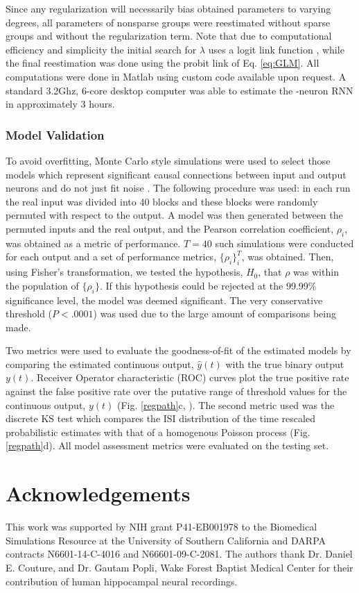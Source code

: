 \documentclass[11pt,a4paper,final]{article}
\begin{document}
Since any regularization will necessarily bias obtained parameters to varying degrees, all parameters of nonsparse groups were reestimated without sparse groups and without the regularization term.
Note that due to computational efficiency and simplicity the initial search for $\lambda$ uses a logit link function \citep{breheny15}, while the final reestimation was done using the probit link of Eq. \ref{eq:GLM}.
All computations were done in Matlab using custom code available upon request.
A standard 3.2Ghz, 6-core desktop computer was able to estimate the \nn{}-neuron RNN in approximately 3 hours.

\subsubsection{Model Validation \label{MtV}}
To avoid overfitting, Monte Carlo style simulations were used to select those models which represent significant causal connections between input and output neurons and do not just fit noise \citep{sandler14}.
The following procedure was used: in each run the real input was divided into 40 blocks and these blocks were randomly permuted with respect to the output.
A model was then generated between the permuted inputs and the real output, and the Pearson correlation coefficient, $\rho_{i}$, was obtained as a metric of performance.
$T=40$ such simulations were conducted for each output and a set of performance metrics, $\{\rho_{i}\}_{i}^{T}$, was obtained.
Then, using Fisher's transformation, we tested the hypothesis, $H_{0}$, that $\rho$ was within the population of $\{\rho_{i}\}$.
If this hypothesis could be rejected at the 99.99\% significance level, the model was deemed significant.
The very conservative threshold ($P<.0001$) was used due to the large amount of comparisons being made.

Two metrics were used to evaluate the goodness-of-fit of the estimated models by comparing the estimated continuous output, $\hat{y}(t)$ with the true binary output $y(t)$.
Receiver Operator characteristic (ROC) curves plot the true positive rate against the false positive rate over the putative range of threshold values for the continuous output, $y(t)$ (Fig. \ref{regpath}c, \citet{zanos08}).
The second metric used was the discrete KS test \citep{haslinger10,song13sparse} which compares the ISI distribution of the time rescaled probabilistic estimates with that of a homogenous Poisson process (Fig. \ref{regpath}d).
All model assessment metrics were evaluated on the testing set.



\section*{Acknowledgements}
This work was supported by NIH grant P41-EB001978 to the Biomedical Simulations Resource at the University of Southern California and DARPA contracts N6601-14-C-4016 and N66601-09-C-2081.  The authors thank Dr. Daniel E. Couture, and Dr. Gautam Popli, Wake Forest Baptist Medical Center for their contribution of human hippocampal neural recordings.

%

\printbibliography[heading=bibintoc]
\end{document}
